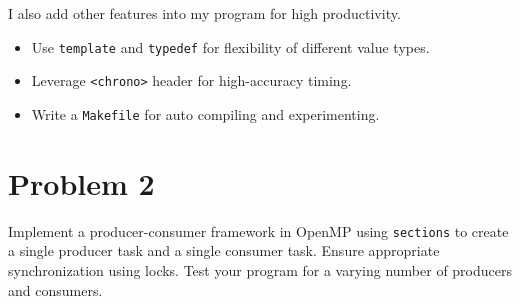 \documentclass[english]{thesis}
\begin{document}
I also add other features into my program for high productivity.
\begin{itemize}
	\item Use \verb'template' and \verb'typedef' for flexibility of different value types.
	\item Leverage \verb'<chrono>' header for high-accuracy timing.
	\item Write a \verb'Makefile' for auto compiling and experimenting.
\end{itemize}

\section{Problem 2}
Implement a producer-consumer framework in OpenMP using \verb'sections' to create a single producer task and a single consumer task. Ensure appropriate synchronization using locks. Test your program for a varying number of producers and consumers.

\bigskip
\end{document}
